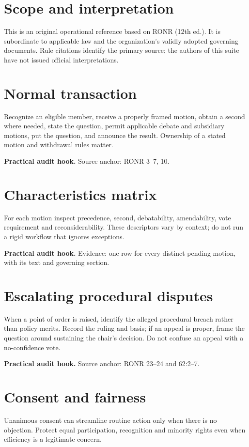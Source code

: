 \documentclass[11pt]{article}
\begin{document}
\SuiteOpen
\section{Scope and interpretation}
This is an original operational reference based on RONR (12th ed.). It is subordinate to applicable law and the organization’s validly adopted governing documents. Rule citations identify the primary source; the authors of this suite have not issued official interpretations.

\section{Normal transaction}
Recognize an eligible member, receive a properly framed motion, obtain a second where needed, state the question, permit applicable debate and subsidiary motions, put the question, and announce the result. Ownership of a stated motion and withdrawal rules matter.

\textbf{Practical audit hook.} Source anchor: RONR 3--7, 10.

\section{Characteristics matrix}
For each motion inspect precedence, second, debatability, amendability, vote requirement and reconsiderability. These descriptors vary by context; do not run a rigid workflow that ignores exceptions.

\textbf{Practical audit hook.} Evidence: one row for every distinct pending motion, with its text and governing section.

\section{Escalating procedural disputes}
When a point of order is raised, identify the alleged procedural breach rather than policy merits. Record the ruling and basis; if an appeal is proper, frame the question around sustaining the chair’s decision. Do not confuse an appeal with a no-confidence vote.

\textbf{Practical audit hook.} Source anchor: RONR 23--24 and 62:2--7.

\section{Consent and fairness}
Unanimous consent can streamline routine action only when there is no objection. Protect equal participation, recognition and minority rights even when efficiency is a legitimate concern.
\end{document}
